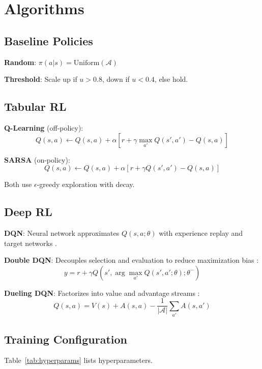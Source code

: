 \documentclass[conference]{IEEEtran}
\begin{document}
\section{Algorithms}

\subsection{Baseline Policies}
\textbf{Random}: $\pi(a|s) = \text{Uniform}(\mathcal{A})$

\textbf{Threshold}: Scale up if $u > 0.8$, down if $u < 0.4$, else hold.

\subsection{Tabular RL}
\textbf{Q-Learning} (off-policy):
\begin{equation}
Q(s,a) \leftarrow Q(s,a) + \alpha[r + \gamma \max_{a'} Q(s',a') - Q(s,a)]
\end{equation}

\textbf{SARSA} (on-policy):
\begin{equation}
Q(s,a) \leftarrow Q(s,a) + \alpha[r + \gamma Q(s',a') - Q(s,a)]
\end{equation}

Both use $\epsilon$-greedy exploration with decay.

\subsection{Deep RL}
\textbf{DQN}: Neural network approximates $Q(s,a;\theta)$ with experience replay and target networks \cite{mnih2015}.

\textbf{Double DQN}: Decouples selection and evaluation to reduce maximization bias \cite{hasselt2016}:
\begin{equation}
y = r + \gamma Q(s', \arg\max_{a'} Q(s',a';\theta); \theta^-)
\end{equation}

\textbf{Dueling DQN}: Factorizes into value and advantage streams \cite{wang2016}:
\begin{equation}
Q(s,a) = V(s) + A(s,a) - \frac{1}{|\mathcal{A}|}\sum_{a'} A(s,a')
\end{equation}

\subsection{Training Configuration}
Table~\ref{tab:hyperparams} lists hyperparameters.
\end{document}
